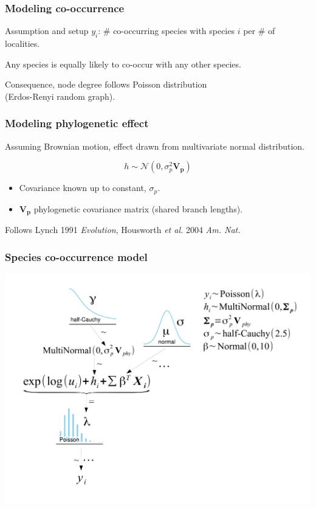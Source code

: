 \documentclass{beamer}
\begin{document}
\begin{frame}
  \frametitle{Modeling co-occurrence}
  \begin{alertblock}{Assumption and setup}
    \(y_{i}\): \# co-occurring species with species \(i\) per \# of localities.

    Any species is equally likely to co-occur with any other species.

    Consequence, node degree follows Poisson distribution \\(Erdos-Renyi random graph).
  \end{alertblock}
\end{frame}

\begin{frame}
  \frametitle{Modeling phylogenetic effect}
  \begin{definition}
    Assuming Brownian motion, effect drawn from multivariate normal distribution.

    \begin{equation*}
      h \sim \mathcal{N}(0, \sigma_{p}^{2}\mathbf{V_{p}})
    \end{equation*}

    \begin{itemize}
      \item Covariance known up to constant, \(\sigma_{p}\).
      \item \(\mathbf{V_{p}}\) phylogenetic covariance matrix (shared branch lengths).
    \end{itemize}

    \tiny{Follows Lynch 1991 \textit{Evolution}, Housworth \textit{et al.} 2004 \textit{Am. Nat.}}
  \end{definition}
\end{frame}

\begin{frame}
  \frametitle{Species co-occurrence model}
  \begin{center}
    \includegraphics[height = 0.8\textheight, width = \textwidth,  keepaspectratio = true]{figure/mammal_degree_model}
  \end{center}
\end{frame}
\end{document}
